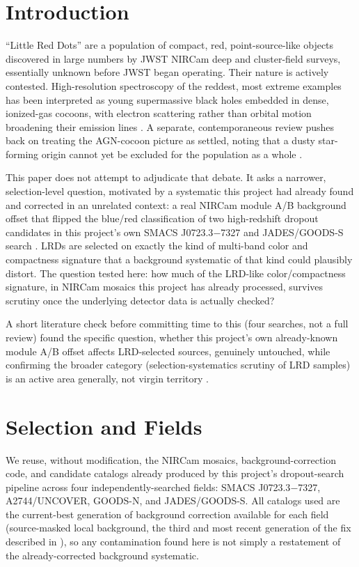 \documentclass[11pt]{article}
\begin{document}
\section{Introduction}

``Little Red Dots'' are a population of compact, red, point-source-like objects
discovered in large numbers by JWST NIRCam deep and cluster-field surveys,
essentially unknown before JWST began operating. Their nature is actively
contested. High-resolution spectroscopy of the reddest, most extreme examples
has been interpreted as young supermassive black holes embedded in dense,
ionized-gas cocoons, with electron scattering rather than orbital motion
broadening their emission lines \cite{Rusakov2026}. A separate, contemporaneous
review pushes back on treating the AGN-cocoon picture as settled, noting that a
dusty star-forming origin cannot yet be excluded for the population as a whole
\cite{InayoshiHo2025}.

This paper does not attempt to adjudicate that debate. It asks a narrower,
selection-level question, motivated by a systematic this project had already
found and corrected in an unrelated context: a real NIRCam module A/B background
offset that flipped the blue/red classification of two high-redshift dropout
candidates in this project's own SMACS J0723.3$-$7327 and JADES/GOODS-S search
\cite{Jarvis2026a}. LRDs are selected on exactly the kind of multi-band color and
compactness signature that a background systematic of that kind could plausibly
distort. The question tested here: how much of the LRD-like color/compactness
signature, in NIRCam mosaics this project has already processed, survives
scrutiny once the underlying detector data is actually checked?

A short literature check before committing time to this (four searches, not a
full review) found the specific question, whether this project's own
already-known module A/B offset affects LRD-selected sources, genuinely
untouched, while confirming the broader category (selection-systematics scrutiny
of LRD samples) is an active area generally, not virgin territory
\cite{Hviding2025,Langeroodi2023}.

\section{Selection and Fields}

We reuse, without modification, the NIRCam mosaics, background-correction code,
and candidate catalogs already produced by this project's dropout-search pipeline
\cite{Jarvis2026a} across four independently-searched fields: SMACS
J0723.3$-$7327, A2744/UNCOVER, GOODS-N, and JADES/GOODS-S. All catalogs used are
the current-best generation of background correction available for each field
(source-masked local background, the third and most recent generation of the fix
described in \cite{Jarvis2026a}), so any contamination found here is not simply a
restatement of the already-corrected background systematic.
\end{document}
